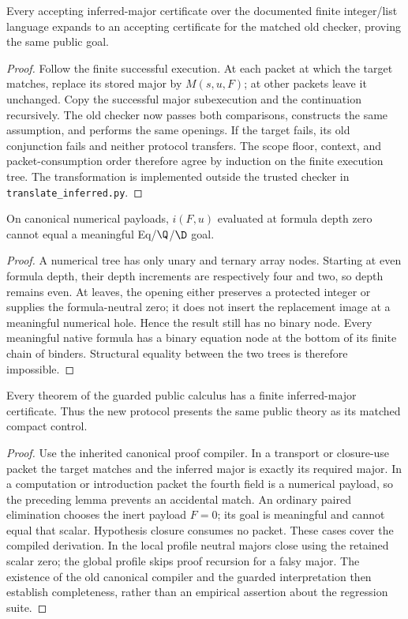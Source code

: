 \begin{theorem}
Every accepting inferred-major certificate over the documented finite
integer/list language expands to an accepting certificate for the matched
old checker, proving the same public goal.
\end{theorem}
\begin{proof}
Follow the finite successful execution. At each packet at which the target
matches, replace its stored major by $M(s,u,F)$; at other packets leave it
unchanged. Copy the successful major subexecution and the continuation
recursively. The old checker now passes both comparisons, constructs the
same assumption, and performs the same openings. If the target fails, its
old conjunction fails and neither protocol transfers. The scope floor,
context, and packet-consumption order therefore agree by induction on the
finite execution tree. The transformation is implemented outside the
trusted checker in \texttt{translate\_inferred.py}.
\end{proof}

\begin{lemma}
On canonical numerical payloads, $i(F,u)$ evaluated at formula depth zero
cannot equal a meaningful Eq/$\Q$/$\D$ goal.
\end{lemma}
\begin{proof}
A numerical tree has only unary and ternary array nodes. Starting at even
formula depth, their depth increments are respectively four and two, so
depth remains even. At leaves, the opening either preserves a protected
integer or supplies the formula-neutral zero; it does not insert the
replacement image at a meaningful numerical hole. Hence the result still
has no binary node. Every meaningful native formula has a binary equation
node at the bottom of its finite chain of binders. Structural equality
between the two trees is therefore impossible.
\end{proof}

\begin{theorem}
Every theorem of the guarded public calculus has a finite inferred-major
certificate. Thus the new protocol presents the same public theory as its
matched compact control.
\end{theorem}
\begin{proof}
Use the inherited canonical proof compiler. In a transport or closure-use
packet the target matches and the inferred major is exactly its required
major. In a computation or introduction packet the fourth field is a
numerical payload, so the preceding lemma prevents an accidental match.
An ordinary paired elimination chooses the inert payload $F=0$; its goal
is meaningful and cannot equal that scalar. Hypothesis closure consumes no
packet. These cases cover the compiled derivation. In the local profile
neutral majors close using the retained scalar zero; the global profile
skips proof recursion for a falsy major. The existence of the old canonical
compiler and the guarded interpretation
then establish completeness, rather than an empirical assertion about
the regression suite.
\end{proof}

